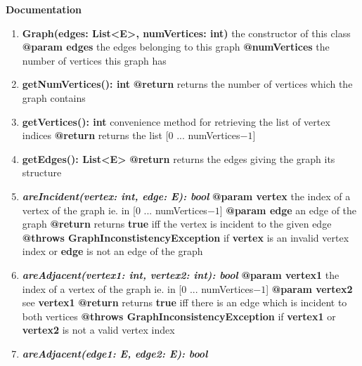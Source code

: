 \documentclass{article}
\begin{document}
	\textbf{Documentation}
	\begin{enumerate}[+]
		\item{
			\textbf{Graph(edges: List<E>, numVertices: int)} \newline
			the constructor of this class \newline
			\textbf{@param edges} the edges belonging to this graph
			\textbf{@numVertices} the number of vertices this graph has
		}
		\item{
			\textbf{getNumVertices(): int} \newline
			\textbf{@return} returns the number of vertices which the graph contains
		}
		\item{
			\textbf{getVertices(): int} \newline
			convenience method for retrieving the list of vertex indices \newline
			\textbf{@return} returns the list [0 ... numVertices$-1$]
		}
		\item{
			\textbf{getEdges(): List<E>} \newline
			\textbf{@return} returns the edges giving the graph its structure
		}
		\item{
			\textbf{\textit{areIncident(vertex: int, edge: E): bool}} \newline
			\textbf{@param vertex} the index of a vertex of the graph ie. in [0 ... numVertices$-1$]\newline
			\textbf{@param edge} an edge of the graph \newline 
			\textbf{@return} returns \textbf{true} iff the vertex is incident to the given edge \newline
			\textbf{@throws GraphInconstistencyException} if \textbf{vertex} is an invalid vertex index or \textbf{edge} is not an edge of the graph
		}
		\item{
			\textbf{\textit{areAdjacent(vertex1: int, vertex2: int): bool}} \newline
			\textbf{@param vertex1} the index of a vertex of the graph ie. in [0 ... numVertices$-1$] \newline
			\textbf{@param vertex2} see \textbf{vertex1} \newline
			\textbf{@return} returns \textbf{true} iff there is an edge which is incident to both vertices \newline
			\textbf{@throws GraphInconsistencyException} if \textbf{vertex1} or \textbf{vertex2} is not a valid vertex index
		}
		\item{
			\textbf\textit{{areAdjacent(edge1: E, edge2: E): bool}} \newline
}
\end{enumerate}
\end{document}
